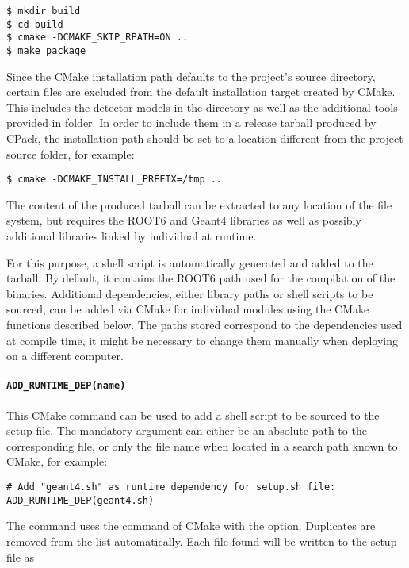 \begin{verbatim}
$ mkdir build
$ cd build
$ cmake -DCMAKE_SKIP_RPATH=ON ..
$ make package
\end{verbatim}

Since the CMake installation path defaults to the project's source directory, certain files are excluded from the default installation target created by CMake.
This includes the detector models in the  directory as well as the additional tools provided in  folder. In order to include them in a release tarball produced by CPack, the installation path should be set to a location different from the project source folder, for example:

\begin{verbatim}
$ cmake -DCMAKE_INSTALL_PREFIX=/tmp ..
\end{verbatim}

The content of the produced tarball can be extracted to any location of the file system, but requires the ROOT6 and Geant4 libraries as well as possibly additional libraries linked by individual at runtime.

For this purpose, a  shell script is automatically generated and added to the tarball.
By default, it contains the ROOT6 path used for the compilation of the binaries.
Additional dependencies, either library paths or shell scripts to be sourced, can be added via CMake for individual modules using the CMake functions described below.
The paths stored correspond to the dependencies used at compile time, it might be necessary to change them manually when deploying on a different computer.

\paragraph{\texttt{\textbf{ADD\_RUNTIME\_DEP(name)}}}

This CMake command can be used to add a shell script to be sourced to the setup file.
The mandatory argument  can either be an absolute path to the corresponding file, or only the file name when located in a search path known to CMake, for example:

\begin{verbatim}
# Add "geant4.sh" as runtime dependency for setup.sh file:
ADD_RUNTIME_DEP(geant4.sh)
\end{verbatim}

The command uses the  command of CMake with the  option.
Duplicates are removed from the list automatically.
Each file found will be written to the setup file as


